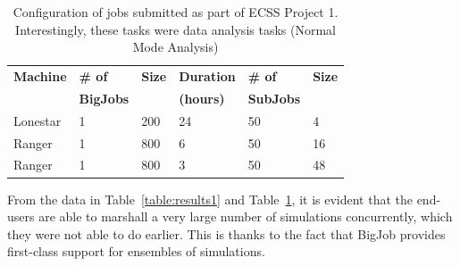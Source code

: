\documentclass{sig-alternate}
\begin{document}
\begin{table}[h]
\begin{center}
\begin{tabular}{p{1.1cm}p{1.2cm}p{0.8cm}p{1.2cm}p{1.1cm}p{0.8cm}}
\toprule
\textbf{Machine}  & 
\textbf{\# of}    &
\textbf{Size}     & 
\textbf{Duration} & 
\textbf{\# of}    &
\textbf{Size}     \\
                  &
\textbf{BigJobs}  &
                  &
\textbf{(hours)}  &
\textbf{SubJobs}  &
                  \\ \midrule
Lonestar & 1 &  200 & 24 &  50 &  4 \\ \midrule
Ranger   & 1 &  800 &  6 &  50 & 16 \\ \midrule
Ranger   & 1 &  800 &  3 &  50 & 48 \\ \bottomrule
\end{tabular}
\caption{Configuration of jobs submitted as part of ECSS Project
  1. Interestingly, these tasks were data analysis tasks (Normal Mode
  Analysis)}
\label{table:results}
\end{center}
\end{table}

From the data in Table~\ref{table:results1} and
Table~\ref{table:results}, it is evident that the end-users are able
to marshall a very large number of simulations concurrently, which
they were not able to do earlier. This is thanks to the fact that
BigJob provides first-class support for ensembles of simulations.

\end{document}
